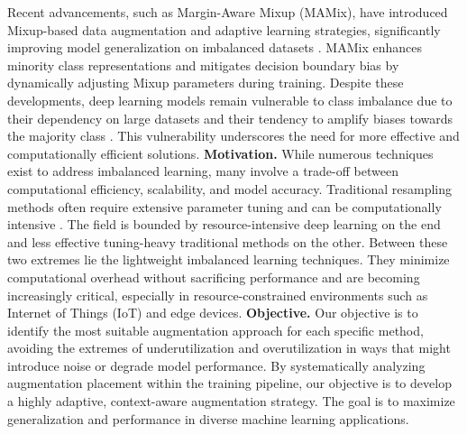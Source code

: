 Recent advancements, such as  Margin-Aware Mixup (MAMix), have introduced Mixup-based data augmentation and adaptive learning strategies, significantly improving model generalization on imbalanced datasets \cite{cheng2023smote}. MAMix enhances minority class representations and mitigates decision boundary bias by dynamically adjusting Mixup parameters during training. Despite these developments, deep learning models remain vulnerable to class imbalance due to their dependency on large datasets and their tendency to amplify biases towards the majority class \cite{krawczyk2016learning}. This vulnerability underscores the need for more effective and computationally efficient solutions.
\textbf{Motivation.} While numerous techniques exist to address imbalanced learning, many involve a trade-off between computational efficiency, scalability, and model accuracy. Traditional resampling methods often require extensive parameter tuning and can be computationally intensive \cite{he2009learning}.
The field is bounded by resource-intensive deep learning on the end and less effective tuning-heavy traditional methods on the other. Between these two extremes lie the lightweight imbalanced learning techniques. They minimize computational overhead without sacrificing performance and are becoming increasingly critical, especially in resource-constrained environments such as Internet of Things (IoT) and edge devices.
\texorpdfstring{\textbf{Objective.}}{Objective.}
Our objective is to identify
the most suitable augmentation approach for each specific
method, avoiding the extremes of underutilization and overutilization in ways that might introduce noise or degrade model performance. By systematically analyzing augmentation placement within the training pipeline, our objective is to develop a highly adaptive, context-aware augmentation strategy. The goal is to maximize generalization and performance in diverse machine learning applications.

